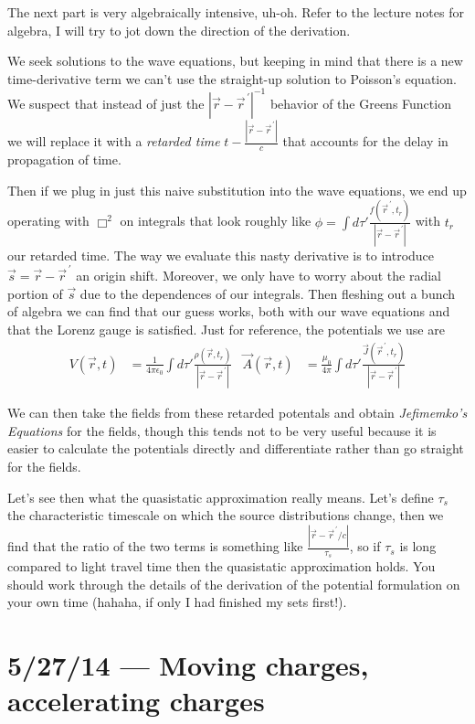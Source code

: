 \documentclass[10pt]{report}
\newcommand{\pvec}[1]{\vec{#1}^{\,\prime}}
\newcommand{\abs}[1]{\left|#1\right|}
\begin{document}
The next part is very algebraically intensive, uh-oh. Refer to the lecture notes for algebra, I will try to jot down the direction of the derivation.

We seek solutions to the wave equations, but keeping in mind that there is a new time-derivative term we can't use the straight-up solution to Poisson's equation. We suspect that instead of just the $\abs{\vec{r} - \pvec{r}}^{-1}$ behavior of the Greens Function we will replace it with a \emph{retarded time} $t - \frac{\abs{\vec{r} - \pvec{r}}}{c}$ that accounts for the delay in propagation of time.

Then if we plug in just this naive substitution into the wave equations, we end up operating with $\Box^2$ on integrals that look roughly like $\phi = \int d\tau' \frac{f(\pvec{r}, t_r)}{\abs{\vec{r} - \pvec{r}}}$ with $t_r$ our retarded time. The way we evaluate this nasty derivative is to introduce $\vec{s} = \vec{r} - \pvec{r}$ an origin shift. Moreover, we only have to worry about the radial portion of $\vec{s}$ due to the dependences of our integrals. Then fleshing out a bunch of algebra we can find that our guess works, both with our wave equations and that the Lorenz gauge is satisfied. Just for reference, the potentials we use are
\begin{align}
    V(\vec{r},t) &= \frac{1}{4\pi\epsilon_0}\int d\tau' \frac{\rho(\vec{r}, t_r)}{\abs{\vec{r} - \pvec{r}}} &  \vec{A}(\vec{r},t) &= \frac{\mu_0}{4\pi}\int d\tau'\frac{\vec{J}(\pvec{r},t_r)}{\abs{\vec{r} - \pvec{r}}}
\end{align}

We can then take the fields from these retarded potentals and obtain \emph{Jefimemko's Equations} for the fields, though this tends not to be very useful because it is easier to calculate the potentials directly and differentiate rather than go straight for the fields. 

Let's see then what the quasistatic approximation really means. Let's define $\tau_s$ the characteristic timescale on which the source distributions change, then we find that the ratio of the two terms is something like $\frac{\abs{\vec{r} - \pvec{r}/c}}{\tau_s}$, so if $\tau_s$ is long compared to light travel time then the quasistatic approximation holds. You should work through the details of the derivation of the potential formulation on your own time (hahaha, if only I had finished my sets first!).

\chapter{5/27/14 --- Moving charges, accelerating charges}
\end{document}
